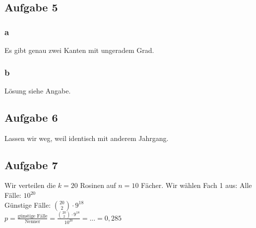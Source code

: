 \subsection{Aufgabe 5}

\subsubsection{a}
Es gibt genau zwei Kanten mit ungeradem Grad. 

\subsubsection{b}
Lösung siehe Angabe. 

\subsection{Aufgabe 6}
Lassen wir weg, weil identisch mit anderem Jahrgang.

\subsection{Aufgabe 7}
Wir verteilen die $k=20$ Rosinen auf $n=10$ Fächer. Wir wählen Fach 1 aus: 
Alle Fälle: $10^{20}$\\
Günstige Fälle: $\binom{20}{2}\cdot 9^{18}$\\
$p=\frac{\textrm{günstige Fälle}}{\textrm{Nenner}}=\frac{\binom{20}{2}\cdot 9^{18}}{10^{20}}=...=0,285$
